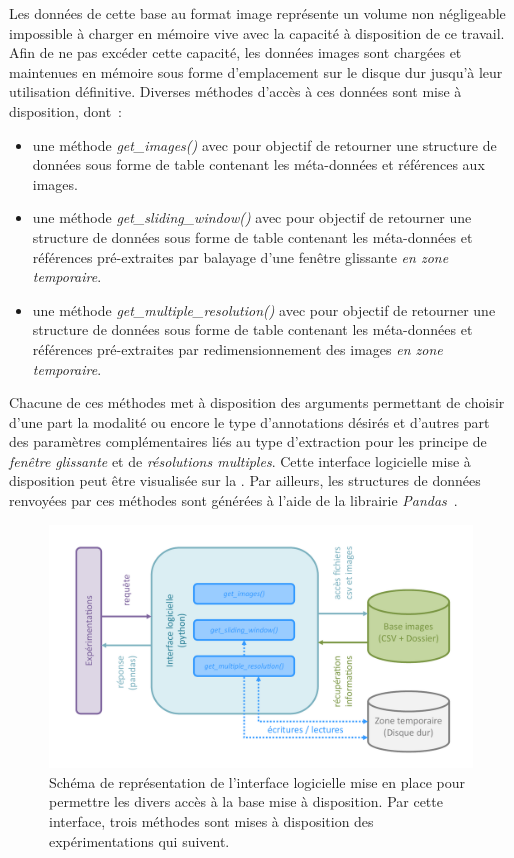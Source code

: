 Les données de cette base au format image représente un volume non négligeable impossible à charger en mémoire vive avec la capacité à disposition de ce travail. Afin de ne pas excéder cette capacité, les données images sont chargées et maintenues en mémoire sous forme d'emplacement sur le disque dur jusqu'à leur utilisation définitive. Diverses méthodes d'accès à ces données sont mise à disposition, dont~:
\begin{itemize}
    \item une méthode \textit{get\_images()} avec pour objectif de retourner une structure de données sous forme de table contenant les méta-données et références aux images.
    \item une méthode \textit{get\_sliding\_window()} avec pour objectif de retourner une structure de données sous forme de table contenant les méta-données et références pré-extraites par balayage d'une fenêtre glissante \textit{en zone temporaire}.
    \item une méthode \textit{get\_multiple\_resolution()} avec pour objectif de retourner une structure de données sous forme de table contenant les méta-données et références pré-extraites par redimensionnement des images  \textit{en zone temporaire}.
\end{itemize} Chacune de ces méthodes met à disposition des arguments permettant de choisir d'une part la modalité ou encore le type d'annotations désirés et d'autres part des paramètres complémentaires liés au type d'extraction pour les principe de \textit{fenêtre glissante} et de \textit{résolutions multiples}. Cette interface logicielle mise à disposition peut être visualisée sur la . Par ailleurs, les structures de données renvoyées par ces méthodes sont générées à l'aide de la librairie \textit{Pandas}~\cite{Pandas2020}.\par 

\begin{figure}[H]
    \centering
    \includegraphics[width=\linewidth]{contents/chapter_4/resources/schema_database_api.pdf}
    \caption{Schéma de représentation de l'interface logicielle mise en place pour permettre les divers accès à la base mise à disposition. Par cette interface, trois méthodes sont mises à disposition des expérimentations qui suivent.}
    \label{fig:schema_database_api}
\end{figure}\par
\clearpage

